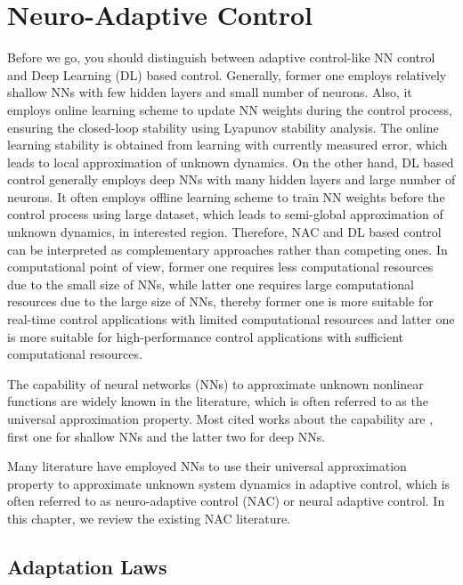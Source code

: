 
\chapter{Neuro-Adaptive Control}

Before we go, you should distinguish between adaptive control-like NN control and Deep Learning (DL) based control.
Generally, former one employs relatively shallow NNs with few hidden layers and small number of neurons.
Also, it employs online learning scheme to update NN weights during the control process, ensuring the closed-loop stability using Lyapunov stability analysis.
The online learning stability is obtained from learning with currently measured error, which leads to local approximation of unknown dynamics.
On the other hand, DL based control generally employs deep NNs with many hidden layers and large number of neurons.
It often employs offline learning scheme to train NN weights before the control process using large dataset, which leads to semi-global approximation of unknown dynamics, in interested region.
Therefore, NAC and DL based control can be interpreted as complementary approaches rather than competing ones.
In computational point of view, former one requires less computational resources due to the small size of NNs, while latter one requires large computational resources due to the large size of NNs, thereby former one is more suitable for real-time control applications with limited computational resources and latter one is more suitable for high-performance control applications with sufficient computational resources.

\hfill

The capability of neural networks (NNs) to approximate unknown nonlinear functions are widely known in the literature, which is often referred to as the universal approximation property.
Most cited works about the capability are \cite{Barron:1993aa,Rolnick:2018aa,Kidger:2020aa}, first one for shallow NNs and the latter two for deep NNs.

Many literature have employed NNs to use their universal approximation property to approximate unknown system dynamics in adaptive control, which is often referred to as neuro-adaptive control (NAC) or neural adaptive control.
In this chapter, we review the existing NAC literature.

\section{Adaptation Laws}


